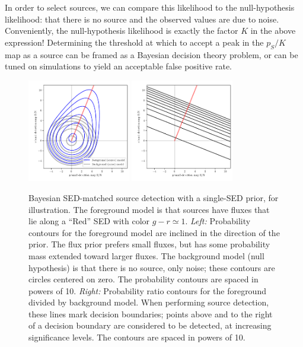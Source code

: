 \documentclass[11pt,letterpaper,linenumbers]{aastex63}
\begin{document}
In order to select sources, we can compare this likelihood to the
null-hypothesis likelihood: that there is no source and the observed
values are due to noise.  Conveniently, the null-hypothesis likelihood
is exactly the factor $K$ in the above expression!  Determining the
threshold at which to accept a peak in the $p_S/K$ map as a source can
be framed as a Bayesian decision theory problem, or can be tuned on
simulations to yield an acceptable false positive rate.


\begin{figure}
  \begin{center}
    \includegraphics[width=0.4\textwidth]{prob-contours-a}
    \includegraphics[width=0.4\textwidth]{prob-rel-a}
    \caption{Bayesian SED-matched source detection with a single-SED prior, for illustration.
      The foreground model is that sources have fluxes that lie along a ``Red''
      SED with color $g-r \simeq 1$.
      \emph{Left:} Probability contours for the foreground model are inclined in the
      direction of the prior.  The flux prior prefers small fluxes, but has some
      probability mass extended toward larger fluxes.
      The background model (null hypothesis) is that there is no source, only noise; these
      contours are circles centered on zero.
      The probability contours are spaced in powers of 10.
      \emph{Right:} Probability ratio contours for the
      foreground divided by background model.
      When performing source detection, these lines mark decision boundaries;
      points above and to the right of a decision boundary are
      considered to be detected, at increasing significance levels.
      The contours are spaced in powers of 10.
      \label{fig:cona}
    }
    \end{center}
\end{figure}
\end{document}
